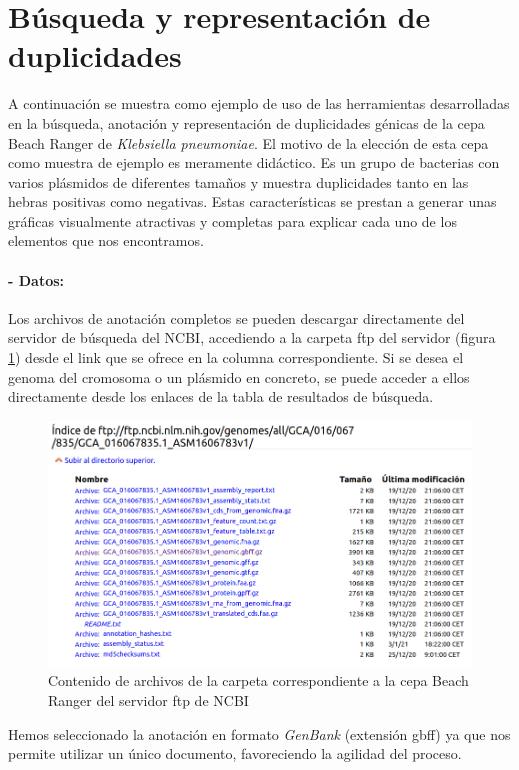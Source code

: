 \newpage
\section{Búsqueda y representación de duplicidades}

A continuación se muestra como ejemplo de uso de las herramientas desarrolladas en la búsqueda, anotación y representación de duplicidades génicas de la cepa Beach Ranger de \textit{Klebsiella pneumoniae}. El motivo de la elección de esta cepa como muestra de ejemplo es meramente didáctico. Es un grupo de bacterias con varios plásmidos de diferentes tamaños y muestra duplicidades tanto en las hebras positivas como negativas. Estas características se prestan a generar unas gráficas visualmente atractivas y completas para explicar cada uno de los elementos que nos encontramos.

\paragraph{\textbf{- Datos: }} Los archivos de anotación completos se pueden descargar directamente del servidor de búsqueda del NCBI, accediendo a la carpeta ftp del servidor (figura \ref{fig:ncbi_beach}) desde el link que se ofrece en la columna correspondiente. Si se desea el genoma del cromosoma o un plásmido en concreto, se puede acceder a ellos directamente desde los enlaces de la tabla de resultados de búsqueda.

\begin{figure}[h]
	\centering
	\captionsetup{width=0.6\linewidth} 
	\includegraphics[width=0.6\linewidth]{figs/ncbi_beach.png}
	\caption[Carpeta ftp de NCBI]{Contenido de archivos de la carpeta correspondiente a la cepa Beach Ranger del servidor ftp de NCBI}
	\label{fig:ncbi_beach}
\end{figure}

Hemos seleccionado la anotación en formato \textit{GenBank} (extensión gbff) ya que nos permite utilizar un único documento, favoreciendo la agilidad del proceso.

